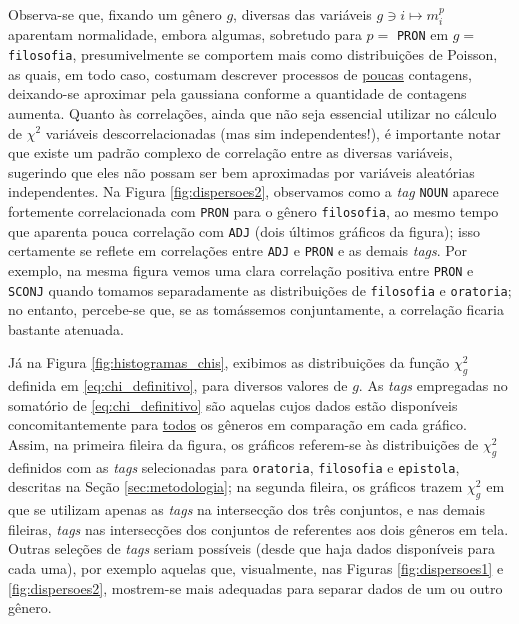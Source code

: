 \documentclass[10pt,a4paper,onecolumn]{article}
\theoremstyle{definition}
\theoremstyle{remark}
\begin{document}
\break

Observa-se que, fixando um gênero $g$, diversas das variáveis $g \ni i \mapsto m^p_i$ aparentam normalidade, embora algumas, sobretudo para $p = $ \texttt{PRON} em $g = $ \texttt{filosofia}, presumivelmente se comportem mais como distribuições de Poisson, as quais, em todo caso, costumam descrever processos de \underline{poucas} contagens, deixando-se aproximar pela gaussiana conforme a quantidade de contagens aumenta. Quanto às correlações, ainda que não seja essencial utilizar no cálculo de $\chi^2$ variáveis descorrelacionadas (mas sim independentes!), é importante notar que existe um padrão complexo de correlação entre as diversas variáveis, sugerindo que eles não possam ser bem aproximadas por variáveis aleatórias independentes. Na Figura \ref{fig:dispersoes2}, observamos como a \emph{tag} \texttt{NOUN} aparece fortemente correlacionada com \texttt{PRON} para o gênero \texttt{filosofia}, ao mesmo tempo que aparenta pouca correlação com \texttt{ADJ} (dois últimos gráficos da figura); isso certamente se reflete em correlações entre \texttt{ADJ} e \texttt{PRON} e as demais \emph{tags}. Por exemplo, na mesma figura vemos uma clara correlação positiva entre \texttt{PRON} e \texttt{SCONJ} quando tomamos separadamente as distribuições de \texttt{filosofia} e \texttt{oratoria}; no entanto, percebe-se que, se as tomássemos conjuntamente, a correlação ficaria bastante atenuada. 

Já na Figura \ref{fig:histogramas_chis}, exibimos as distribuições da função $\chi^2_g$ definida em \eqref{eq:chi_definitivo}, para diversos valores de $g$. As \emph{tags} empregadas no somatório de \eqref{eq:chi_definitivo} são aquelas cujos dados estão disponíveis concomitantemente para \underline{todos} os gêneros em comparação em cada gráfico. Assim, na primeira fileira da figura, os gráficos referem-se às distribuições de $\chi^2_g$ definidos com as \emph{tags} selecionadas para \texttt{oratoria}, \texttt{filosofia} e \texttt{epistola}, descritas na Seção \ref{sec:metodologia}; na segunda fileira, os gráficos trazem $\chi^2_g$ em que se utilizam apenas as \emph{tags} na intersecção dos três conjuntos, e nas demais fileiras, \emph{tags} nas intersecções dos conjuntos de referentes aos dois gêneros em tela. Outras seleções de \emph{tags} seriam possíveis (desde que haja dados disponíveis para cada uma), por exemplo aquelas que, visualmente, nas Figuras \ref{fig:dispersoes1} e \ref{fig:dispersoes2}, mostrem-se mais adequadas para separar dados de um ou outro gênero.
\end{document}
